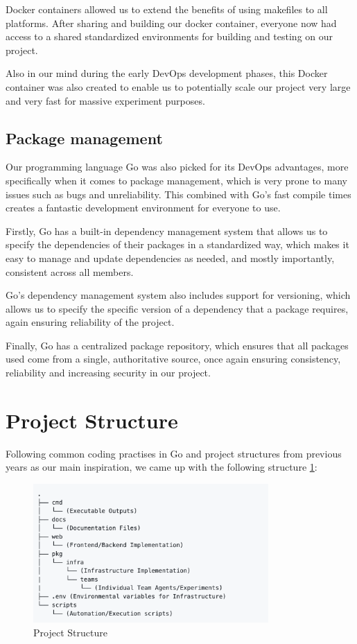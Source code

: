 Docker containers allowed us to extend the benefits of using makefiles to all platforms. After sharing and building our docker container, everyone now had access to a shared standardized environments for building and testing on our project. 

Also in our mind during the early DevOps development phases, this Docker container was also created to enable us to potentially scale our project very large and very fast for massive experiment purposes.


\subsection{Package management}

Our  programming language Go was also picked for its DevOps advantages, more specifically when it comes to package management, which is very prone to many issues such as bugs and unreliability. This combined with Go's fast compile times creates a fantastic development environment for everyone to use. 

Firstly, Go has a built-in dependency management system that allows us to specify the dependencies of their packages in a standardized way, which makes it easy to manage and update dependencies as needed, and mostly importantly, consistent across all members. 

Go's dependency management system also includes support for versioning, which allows us to specify the specific version of a dependency that a package requires, again ensuring reliability of the project.

Finally, Go has a centralized package repository, which ensures that all packages used come from a single, authoritative source,  once again ensuring consistency, reliability and increasing security in our project.

\newpage

\section{Project Structure}

Following common coding practises in Go and project structures from previous years as our main inspiration, we came up with the following structure \ref{fig:proj_struct}:

\begin{figure}[h]
    \centering
    \includegraphics[width=0.8\textwidth]{figures/proj_struct.png}
    \caption{Project Structure}
    \label{fig:proj_struct}
\end{figure}